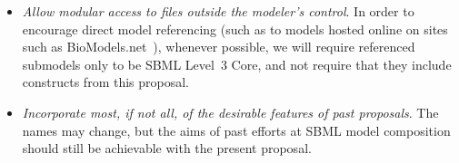 \begin{itemize}
\item \emph{Allow modular access to files outside the modeler's
    control}.  In order to encourage direct model referencing (such as
  to models hosted online on sites such as BioModels.net~\cite{x}),
  whenever possible, we will require referenced submodels only to be
  SBML Level~3 Core, and not require that they include constructs from
  this proposal.

\item \emph{Incorporate most, if not all, of the desirable features of
    past proposals}. The names may change, but the aims of past efforts
  at SBML model composition should still be achievable with the present
  proposal.

\end{itemize}

